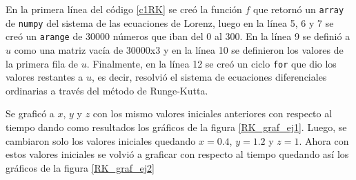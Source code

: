 \documentclass[../portafolio.tex]{subfiles}
\begin{document}




En la primera línea del código \ref{c1RK} se creó la función $f$ que retornó un \texttt{array} de \texttt{numpy} del sistema de las ecuaciones de Lorenz, luego en la línea 5, 6 y 7 se creó un \texttt{arange} de $30000$ números que iban del $0$ al $300$. En la línea 9 se definió a $u$ como una matriz vacía de $30000$x$3$ y en la línea 10 se definieron los valores de la primera fila de $u$. Finalmente, en la línea 12 se creó un ciclo \texttt{for} que dio los valores restantes a $u$, es decir, resolvió el sistema de ecuaciones diferenciales ordinarias a través del método de Runge-Kutta.

\vspace{2mm}
Se graficó a $x$, $y$ y $z$ con los mismo valores iniciales anteriores con respecto al tiempo dando como resultados los gráficos de la figura \ref{RK_graf_ej1}. Luego, se cambiaron solo los valores iniciales quedando $x=0.4$, $y=1.2$ y $z=1$. Ahora con estos valores iniciales se volvió a graficar con respecto al tiempo quedando así los gráficos de la figura \ref{RK_graf_ej2}
\end{document}
